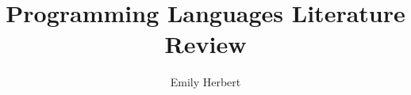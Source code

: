 \usepackage{url}
\usepackage{hyperref}
\usepackage{xcolor}

\usepackage[english]{babel}

\setcounter{topnumber}{10}
\setcounter{bottomnumber}{10}
\setcounter{totalnumber}{10}
\setcounter{dbltopnumber}{10}
\def\topfraction{1.0}
\def\bottomfraction{1.0}
\def\textfraction{0.0}
\def\dbltopfraction{1.0}

\usepackage{fancyhdr}
\pagestyle{fancy}
\lhead{}
\chead{}
\rhead{\rm\thepage}
\lfoot{}
\cfoot{}
\rfoot{}
\renewcommand{\headrulewidth}{0pt}
\renewcommand{\footrulewidth}{0pt}

\usepackage[top=2.0in,bottom=1.5in,left=1.5in,right=1.0in]{geometry}

\newcommand{\theAuthor}{Emily Herbert}
\newcommand{\theTitle}{Programming Languages Literature Review}
\newcommand{\theStartDate}{September 28, 2018}
\author{\theAuthor}
\title{\theTitle}

\newcommand{\question}[1]{\color[rgb]{1,0,0} #1 \color{saved}}

